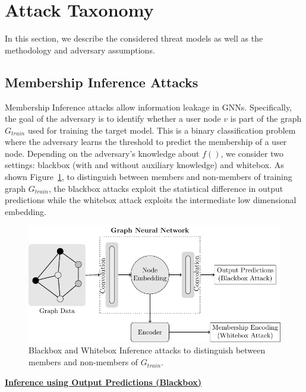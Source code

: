 \section{Attack Taxonomy}\label{attack}

In this section, we describe the considered threat models as well as the methodology and adversary assumptions.


\subsection{Membership Inference Attacks}

Membership Inference attacks allow information leakage in GNNs.
Specifically, the goal of the adversary is to identify whether a user node $v$ is part of the graph $G_{train}$ used for training the target model.
This is a binary classification problem where the adversary learns the threshold to predict the membership of a user node.
Depending on the adversary's knowledge about $f()$, we consider two settings: blackbox (with and without auxiliary knowledge) and whitebox. %
As shown Figure~\ref{mia}, to distinguish between members and non-members of training graph $G_{train}$, the blackbox attacks exploit the statistical difference in output predictions while the whitebox attack exploits the intermediate low dimensional embedding.


\begin{figure}[!htb]
\centering
\includegraphics[width=0.85\linewidth]{./figures/Attacks/MIA.pdf}
\caption{Blackbox and Whitebox Inference attacks to distinguish between members and non-members of $G_{train}$.}
\label{mia}
\end{figure}


\noindent\textbf{\underline{Inference using Output Predictions (Blackbox)}}

